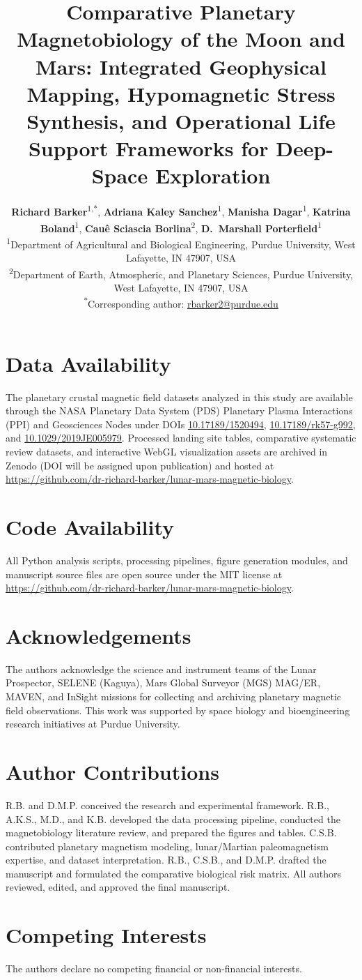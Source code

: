 \documentclass{npj-article}
\title{Comparative Planetary Magnetobiology of the Moon and Mars: Integrated Geophysical Mapping, Hypomagnetic Stress Synthesis, and Operational Life Support Frameworks for Deep-Space Exploration}
\author{%
  \textbf{Richard Barker}\textsuperscript{1,*},
  \textbf{Adriana Kaley Sanchez}\textsuperscript{1},
  \textbf{Manisha Dagar}\textsuperscript{1},
  \textbf{Katrina Boland}\textsuperscript{1},
  \textbf{Cau\^{e} Sciascia Borlina}\textsuperscript{2},
  \textbf{D.~Marshall Porterfield}\textsuperscript{1}
  \vspace{2mm}\\
  \textsuperscript{1}\footnotesize Department of Agricultural and Biological Engineering, Purdue University, West Lafayette, IN 47907, USA\\
  \textsuperscript{2}\footnotesize Department of Earth, Atmospheric, and Planetary Sciences, Purdue University, West Lafayette, IN 47907, USA\\
  \textsuperscript{*}\footnotesize Corresponding author: \href{mailto:rbarker2@purdue.edu}{rbarker2@purdue.edu}
}
\begin{document}
\makefrontmatter







\section*{Data Availability}
The planetary crustal magnetic field datasets analyzed in this study are available through the NASA Planetary Data System (PDS) Planetary Plasma Interactions (PPI) and Geosciences Nodes under DOIs \href{https://doi.org/10.17189/1520494}{10.17189/1520494}, \href{https://doi.org/10.17189/rk57-g992}{10.17189/rk57-g992}, and \href{https://doi.org/10.1029/2019JE005979}{10.1029/2019JE005979}. Processed landing site tables, comparative systematic review datasets, and interactive WebGL visualization assets are archived in Zenodo (DOI will be assigned upon publication) and hosted at \url{https://github.com/dr-richard-barker/lunar-mars-magnetic-biology}.

\section*{Code Availability}
All Python analysis scripts, processing pipelines, figure generation modules, and manuscript source files are open source under the MIT license at \url{https://github.com/dr-richard-barker/lunar-mars-magnetic-biology}.

\section*{Acknowledgements}
The authors acknowledge the science and instrument teams of the Lunar Prospector, SELENE (Kaguya), Mars Global Surveyor (MGS) MAG/ER, MAVEN, and InSight missions for collecting and archiving planetary magnetic field observations. This work was supported by space biology and bioengineering research initiatives at Purdue University.

\section*{Author Contributions}
R.B. and D.M.P. conceived the research and experimental framework. R.B., A.K.S., M.D., and K.B. developed the data processing pipeline, conducted the magnetobiology literature review, and prepared the figures and tables. C.S.B. contributed planetary magnetism modeling, lunar/Martian paleomagnetism expertise, and dataset interpretation. R.B., C.S.B., and D.M.P. drafted the manuscript and formulated the comparative biological risk matrix. All authors reviewed, edited, and approved the final manuscript.

\section*{Competing Interests}
The authors declare no competing financial or non-financial interests.

\renewcommand{\bibnumfmt}[1]{#1.}


\end{document}

